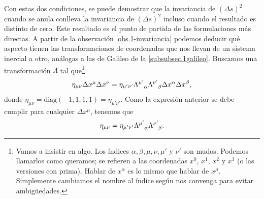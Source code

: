 Con estas dos condiciones, se puede demostrar que la invariancia de \(\left(\Delta s\right)^2\) cuando se anula conlleva la invariancia de \(\left(\Delta s\right)^2\) incluso cuando el resultado es distinto de cero. Este resultado es el punto de partida de las formulaciones más directas. A partir de la observación \cref{obs.1-invariancia} podemos deducir qué aspecto tienen las transformaciones de coordenadas que nos llevan de un sistema inercial a otro, análogas a las de Galileo de la \cref{subsubsec.1galileo}. Buscamos una transformación \(\Lambda\) tal que\footnote{Vamos a insistir en algo. Los índices \(\alpha, \beta, \mu, \nu, \mu'\) y \(\nu'\) son mudos. Podemos llamarlos como queramos; se refieren a las coordenadas \(x^0\), \(x^1\), \(x^2\) y \(x^3\) (o las versiones con prima). Hablar de \(x^\alpha\) es lo mismo que hablar de \(x^\mu\). Simplemente cambiamos el nombre al índice según nos convenga para evitar ambigüedades.} 
\begin{equation*}
    \eta_{\mu\nu}\Delta x^\mu \Delta x^\nu = \eta_{\mu'\nu'}\tensor{\Lambda}{^{\mu'}_\alpha} \tensor{\Lambda}{^{\nu'}_\beta}\Delta x^{\alpha} \Delta x^{\beta},
\end{equation*}
donde \(\eta_{\mu\nu} = \text{diag}(-1, 1, 1, 1) = \eta_{\mu'\nu'}\). Como la expresión anterior se debe cumplir para cualquier \(\Delta x^\mu\), tenemos que 
\begin{equation*}
    \eta_{\mu\nu} = \eta_{\mu'\nu'}\tensor{\Lambda}{^{\mu'}_\alpha} \tensor{\Lambda}{^{\nu'}_\beta}.
\end{equation*}

